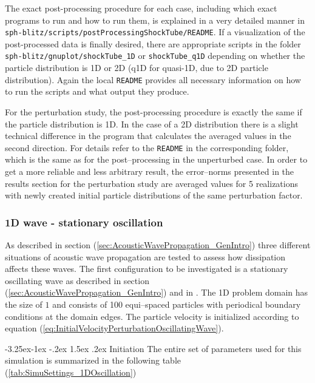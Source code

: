 \documentclass{report}
\makeatletter
\renewcommand\paragraph{\@startsection{paragraph}{4}{\z@}%
  {-3.25ex\@plus -1ex \@minus -.2ex}%
  {1.5ex \@plus .2ex}%
  {\normalfont\normalsize\bfseries}}
\makeatother
\begin{document}
The exact post-processing procedure for each case, including which exact programs to run and how to run them, is explained in a very detailed manner in {\tt sph-blitz/scripts/postProcessingShockTube/README}. If a visualization of the post-processed data is finally desired, there are appropriate scripts in the folder {\tt sph-blitz/gnuplot/shockTube\_1D} or {\tt shockTube\_q1D} depending on whether the particle distribution is 1D or 2D (q1D for quasi-1D, due to 2D particle distribution).
Again the local {\tt README} provides all necessary information on how to run the scripts and what output they produce.

For the perturbation study, the post-processing procedure is exactly the same if the particle distribution is 1D. In the case of a 2D distribution there is a slight technical difference in the program that calculates the averaged values in the second direction. For details refer to the {\tt README} in the corresponding folder, which is the same as for the post--processing in the unperturbed case.
In order to get a more reliable and less arbitrary result, the error--norms presented in the results section for the perturbation study are averaged values for 5 realizations with newly created initial particle distributions of the same perturbation factor. %



\subsubsection{1D wave - stationary oscillation}
As described in section (\ref{sec:AcousticWavePropagation_GenIntro}) three different situations of acoustic wave propagation are tested to assess how dissipation affects these waves. The first configuration to be investigated is a stationary oscillating wave as described in section (\ref{sec:AcousticWavePropagation_GenIntro}) and in \cite{Monaghan2005}. The 1D problem domain has the size of $1$ and consists of 100 equi--spaced particles with periodical boundary conditions at the domain edges. The particle velocity is initialized according to equation (\ref{eq:InitialVelocityPerturbationOscillatingWave}).

\paragraph {Initiation}
The entire set of parameters used for this simulation is summarized in the following table (\ref{tab:SimuSettings_1DOscillation})
\end{document}
